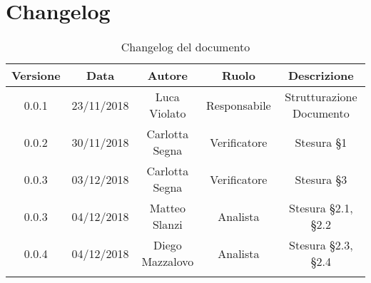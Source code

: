 \section{Changelog}

\begin{center}
\begin{longtable}{|c|c|c|c|c|}
\hline
\textbf{Versione} & \textbf{Data} & \textbf{Autore} & \textbf{Ruolo} & \textbf{Descrizione} \\
\hline \hline
\endfirsthead
0.0.1 & 23/11/2018 & Luca Violato & Responsabile & Strutturazione Documento \\
0.0.2 & 30/11/2018 & Carlotta Segna & Verificatore & Stesura §1 \\
0.0.3 & 03/12/2018 & Carlotta Segna & Verificatore & Stesura §3 \\
0.0.3 & 04/12/2018 & Matteo Slanzi & Analista & Stesura §2.1, §2.2 \\
0.0.4 & 04/12/2018 & Diego Mazzalovo & Analista & Stesura §2.3, §2.4\\
\hline
\caption{Changelog del documento}
\end{longtable}
\end{center}